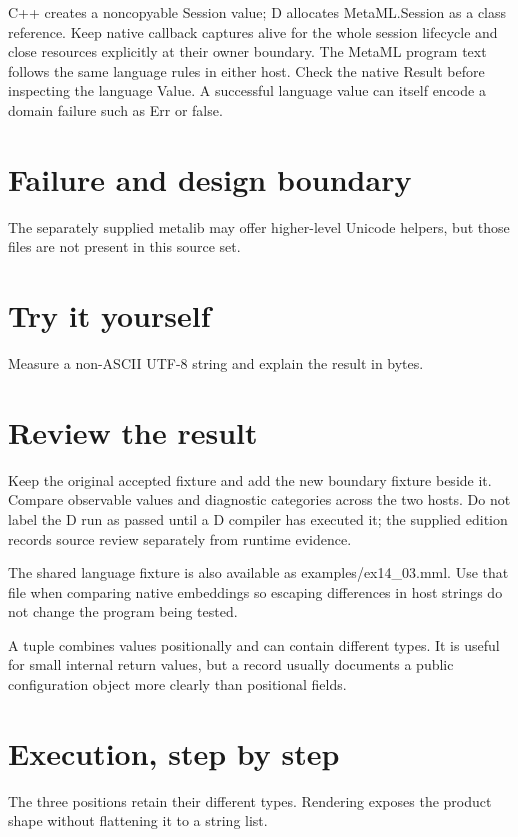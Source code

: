 \clearpage
{}
C++ creates a noncopyable Session value; D allocates MetaML.Session as a class reference. Keep native callback captures alive for the whole session lifecycle and close resources explicitly at their owner boundary. The MetaML program text follows the same language rules in either host. Check the native Result before inspecting the language Value. A successful language value can itself encode a domain failure such as Err or false.


\section*{Failure and design boundary}
The separately supplied metalib may offer higher-level Unicode helpers, but those files are not present in this source set.

\section*{Try it yourself}
Measure a non-ASCII UTF-8 string and explain the result in bytes.

\section*{Review the result}
Keep the original accepted fixture and add the new boundary fixture beside it. Compare observable values and diagnostic categories across the two hosts. Do not label the D run as passed until a D compiler has executed it; the supplied edition records source review separately from runtime evidence.

The shared language fixture is also available as examples/ex14\_03.mml. Use that file when comparing native embeddings so escaping differences in host strings do not change the program being tested.

\clearpage
{}
A tuple combines values positionally and can contain different types. It is useful for small internal return values, but a record usually documents a public configuration object more clearly than positional fields.


\section*{Execution, step by step}
The three positions retain their different types. Rendering exposes the product shape without flattening it to a string list.

